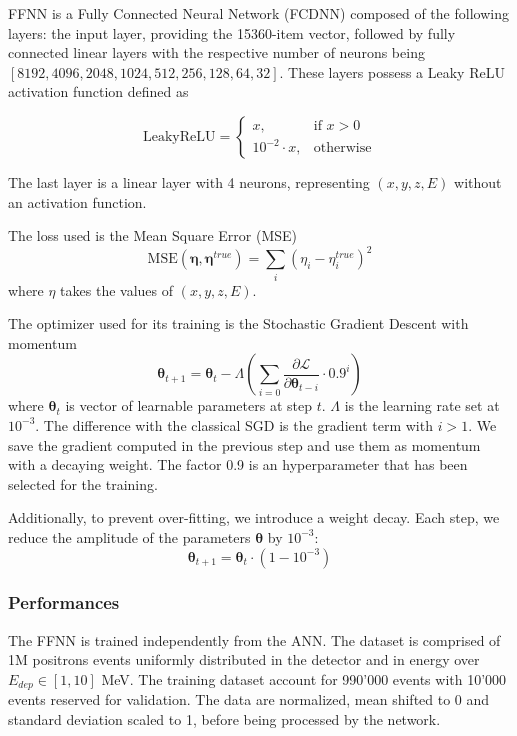 \documentclass[../main.tex]{subfiles}
\begin{document}
FFNN is a Fully Connected Neural Network (FCDNN) composed of the following layers: the input layer, providing the 15360-item vector, followed by fully connected linear layers with the respective number of neurons being $[8192,4096,2048,1024,512,256,128,64,32]$. These layers possess a Leaky ReLU activation function defined as

\begin{equation}
  \mathrm{LeakyReLU} = \begin{cases}
    x, & \text{if } x > 0 \\
    10^{-2} \cdot x, & \text{otherwise}
  \end{cases}
\end{equation}

The last layer is a linear layer with 4 neurons, representing $(x,y,z,E)$ without an activation function.


The loss used is the Mean Square Error (MSE)
\begin{equation}
  \text{MSE}(\bm{\eta}, \bm{\eta}^{true}) = \sum_i (\eta_i - \eta_i^{true})^2
\end{equation}
where $\eta$ takes the values of $(x, y, z, E)$.

The optimizer used for its training is the Stochastic Gradient Descent with momentum
\begin{equation}
  \bm{\theta}_{t+1} = \bm{\theta}_t - \Lambda \left(\sum_{i=0} \frac{\partial \mathcal{L}}{\partial \bm{\theta}_{t - i}} \cdot 0.9^{i} \right)
\end{equation}
where $\bm{\theta}_t$ is vector of learnable parameters at step $t$. $\Lambda$ is the learning rate set at  $10^{-3}$. The difference with the classical SGD is the gradient term with $i > 1$. We save the gradient computed in the previous step and use them as momentum with a decaying weight. The factor 0.9 is an hyperparameter that has been selected for the training.

Additionally, to prevent over-fitting, we introduce a weight decay. Each step, we reduce the amplitude of the parameters $\bm{\theta}$ by $10^{-3}$:
\begin{equation}
  \bm{\theta}_{t+1} = \bm{\theta}_t \cdot (1 - 10^{-3})
\end{equation}

\subsubsection{Performances}

The FFNN is trained independently from the ANN. The dataset is comprised of 1M positrons events uniformly distributed in the detector and in energy over $E_{dep} \in [1, 10]$ MeV. The training dataset account for 990'000 events with 10'000 events reserved for validation. The data are normalized, mean shifted to 0 and standard deviation scaled to 1, before being processed by the network.
\end{document}
